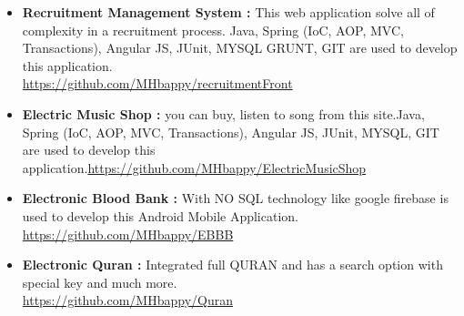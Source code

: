 \begin{cvparagraph}
\begin{itemize}
		\item \textbf{Recruitment Management System : } This web application solve all of complexity in a recruitment process. Java, Spring (IoC, AOP, MVC, Transactions), Angular JS, JUnit, MYSQL GRUNT, GIT are used to develop this application.\\ \underline{https://github.com/MHbappy/recruitmentFront}
		
		\item \textbf{Electric Music Shop : } you can buy, listen to song from this site.Java, Spring (IoC, AOP, MVC, Transactions), Angular JS, JUnit, MYSQL, GIT are used to develop this application.\underline{https://github.com/MHbappy/ElectricMusicShop}
		
				
				\item \textbf{Electronic Blood Bank : } With NO SQL technology like google firebase is used to develop this Android Mobile Application.\\ \underline{https://github.com/MHbappy/EBBB}
				
				\item \textbf{Electronic Quran : } Integrated full QURAN  and has a search option with special key and much more.\\ \underline{https://github.com/MHbappy/Quran}
		
		
		
	\end{itemize}
\end{cvparagraph}


